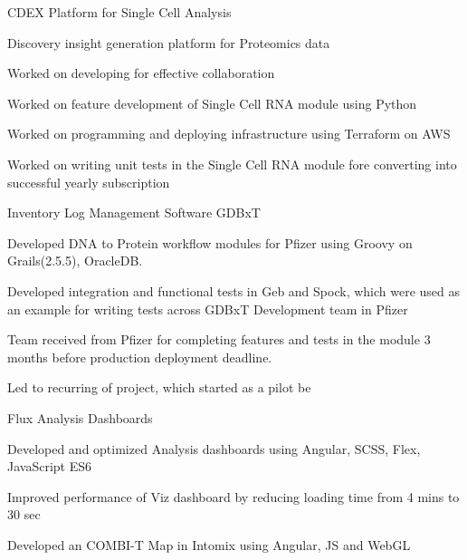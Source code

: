 \documentclass[]{single-page-resume}
\begin{document}
\begin{minipage}[t]{0.66\textwidth}
\vspace{\topsep} %
CDEX Platform for Single Cell Analysis
\begin{tightemize}
    \item Discovery insight generation platform for Proteomics data
    \item Worked on developing  for effective collaboration
    \item Worked on feature development of Single Cell RNA module using Python
    \item Worked on programming and deploying infrastructure using Terraform on AWS
    \item Worked on writing unit tests in the Single Cell RNA module
  fore converting into successful yearly subscription
\end{tightemize}
\vspace{\topsep} %
Inventory Log Management Software GDBxT
\begin{tightemize}
\item Developed DNA to Protein workflow modules for Pfizer using Groovy on Grails(2.5.5), OracleDB. 
\item Developed  integration and functional tests in Geb and Spock, which were used as an example for writing tests across GDBxT Development team in Pfizer
\item Team received  from Pfizer for completing features and tests in the module 3 months before production deployment deadline.
  \item Led to recurring  of project, which started as a pilot be
\end{tightemize}

\vspace{\topsep} %
Flux Analysis Dashboards
\begin{tightemize}
\item Developed and optimized Analysis dashboards using Angular, SCSS, Flex, JavaScript ES6
\item Improved performance of Viz dashboard by reducing loading time from 4 mins to 30 sec
\end{tightemize}
\sectionsep

\begin{tightemize}
    \item Developed an COMBI-T Map in Intomix using Angular, JS and WebGL \end{tightemize}
\sectionsep


\end{minipage}
\end{document}
